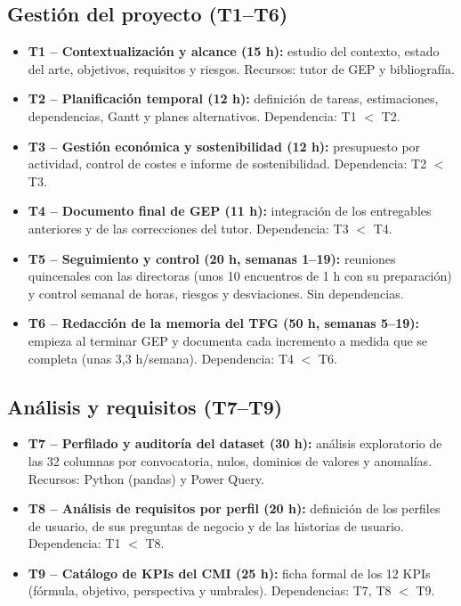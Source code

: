 \documentclass[12pt, a4paper, oneside]{report}
\begin{document}
\subsection{Gestión del proyecto (T1--T6)}
\begin{itemize}
    \item \textbf{T1 -- Contextualización y alcance (15 h):} estudio del contexto, estado del arte, objetivos, requisitos y riesgos. Recursos: tutor de GEP y bibliografía.
    \item \textbf{T2 -- Planificación temporal (12 h):} definición de tareas, estimaciones, dependencias, Gantt y planes alternativos. Dependencia: T1 $<$ T2.
    \item \textbf{T3 -- Gestión económica y sostenibilidad (12 h):} presupuesto por actividad, control de costes e informe de sostenibilidad. Dependencia: T2 $<$ T3.
    \item \textbf{T4 -- Documento final de GEP (11 h):} integración de los entregables anteriores y de las correcciones del tutor. Dependencia: T3 $<$ T4.
    \item \textbf{T5 -- Seguimiento y control (20 h, semanas 1--19):} reuniones quincenales con las directoras (unos 10 encuentros de 1 h con su preparación) y control semanal de horas, riesgos y desviaciones. Sin dependencias.
    \item \textbf{T6 -- Redacción de la memoria del TFG (50 h, semanas 5--19):} empieza al terminar GEP y documenta cada incremento a medida que se completa (unas 3,3 h/semana). Dependencia: T4 $<$ T6.
\end{itemize}

\subsection{Análisis y requisitos (T7--T9)}
\begin{itemize}
    \item \textbf{T7 -- Perfilado y auditoría del dataset (30 h):} análisis exploratorio de las 32 columnas por convocatoria, nulos, dominios de valores y anomalías. Recursos: Python (pandas) y Power Query.
    \item \textbf{T8 -- Análisis de requisitos por perfil (20 h):} definición de los perfiles de usuario, de sus preguntas de negocio y de las historias de usuario. Dependencia: T1 $<$ T8.
    \item \textbf{T9 -- Catálogo de KPIs del CMI (25 h):} ficha formal de los 12 KPIs (fórmula, objetivo, perspectiva y umbrales). Dependencias: T7, T8 $<$ T9.
\end{itemize}
\end{document}
